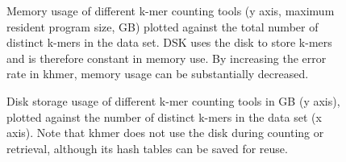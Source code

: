 \documentclass{article}
\begin{document}
\begin{figure}
\caption{Memory usage of different k-mer counting tools (y axis, maximum resident program size, GB) plotted against the total number of distinct k-mers in the data set.  DSK uses the disk to store k-mers and is therefore constant in memory use. By increasing the error rate in khmer, memory usage can be substantially decreased.}
\label{cmp_memory}
\end{figure}

\begin{figure}
\caption{Disk storage usage of different k-mer counting tools in GB (y axis),
plotted against the number of distinct k-mers in the data set (x axis).  Note that khmer does not use the disk during counting or retrieval, although its hash tables can be saved for reuse.}
\label{cmp_disk}
\end{figure}
\end{document}
